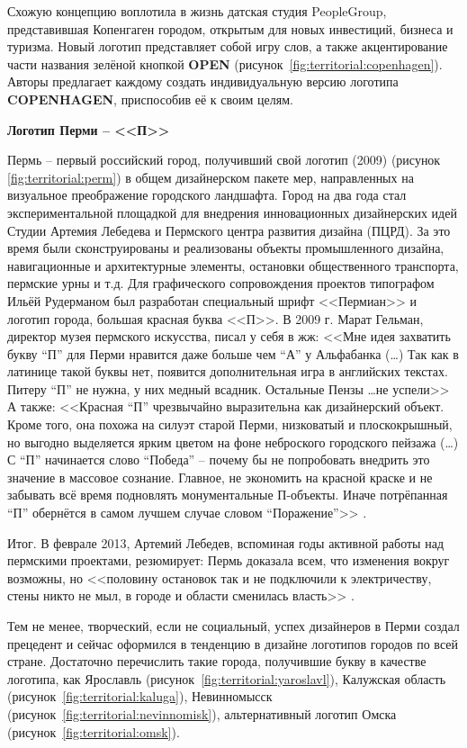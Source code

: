 Схожую концепцию воплотила в жизнь датская студия PeopleGroup, представившая Копенгаген городом,
открытым для новых инвестиций, бизнеса и туризма. Новый логотип представляет собой игру слов, а
также акцентирование части названия зелёной кнопкой \textbf{OPEN}
(рисунок~\ref{fig:territorial:copenhagen}). Авторы предлагает каждому создать
индивидуальную версию логотипа \textbf{COPENHAGEN}, приспособив её к своим целям.

\textbf{Логотип Перми -- <<П>>}

Пермь -- первый российский город, получивший свой логотип (2009) (рисунок \ref{fig:territorial:perm}) в
общем дизайнерском пакете мер, направленных на  визуальное преображение городского ландшафта.  Город
на два года стал экспериментальной площадкой для внедрения инновационных дизайнерских идей Студии
Артемия Лебедева и Пермского центра развития дизайна (ПЦРД). За это время были сконструированы и
реализованы объекты промышленного дизайна, навигационные и  архитектурные элементы, остановки
общественного транспорта, пермские урны и т.д. Для графического сопровождения проектов типографом
Ильёй Рудерманом был разработан  специальный шрифт <<Пермиан>> и логотип города, большая красная
буква <<П>>.  В 2009 г. Марат Гельман, директор музея пермского искусства, писал у себя в жж: <<Мне
идея захватить букву ``П'' для Перми нравится даже больше чем ``А'' у Альфабанка (\ldots) Так как в
латинице такой буквы нет, появится дополнительная игра в английских текстах. Питеру ``П'' не нужна,
у них медный всадник. Остальные Пензы \ldots не успели>> \autocite{link:gelman} А также: <<Красная
``П'' чрезвычайно выразительна как дизайнерский объект. Кроме того, она похожа на силуэт старой Перми,
низковатый и плоскокрышный, но выгодно выделяется ярким цветом на фоне неброского городского пейзажа
(\ldots) С ``П'' начинается слово ``Победа'' -- почему бы не попробовать внедрить это значение в массовое
сознание. Главное, не экономить на красной краске и не забывать всё время подновлять монументальные
П-объекты. Иначе потрёпанная ``П'' обернётся в самом лучшем случае словом
``Поражение''>> \autocite[][361]{book:gordon}.

Итог. В феврале 2013, Артемий Лебедев, вспоминая годы активной работы над пермскими проектами,
резюмирует: Пермь доказала всем, что изменения вокруг возможны, но <<половину остановок так и не
подключили к электричеству, стены никто не мыл, в городе и области сменилась власть>> \autocite{link:lebedev}.

Тем не менее, творческий, если не социальный, успех дизайнеров в Перми создал прецедент и сейчас
оформился в тенденцию в дизайне логотипов городов по всей стране.  Достаточно перечислить такие
города, получившие букву в качестве логотипа, как Ярославль (рисунок~\ref{fig:territorial:yaroslavl}),
Калужская область (рисунок~\ref{fig:territorial:kaluga}), Невинномысск
(рисунок~\ref{fig:territorial:nevinnomisk}), альтернативный логотип Омска (рисунок~\ref{fig:territorial:omsk}).


